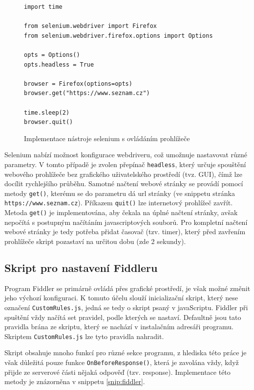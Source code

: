 \documentclass[thesis=M,czech,hidelinks]{FITthesis}[2013/05/06]
\begin{document}
\begin{figure}[h]               
\begin{verbatim}
import time

from selenium.webdriver import Firefox
from selenium.webdriver.firefox.options import Options

opts = Options()
opts.headless = True

browser = Firefox(options=opts)
browser.get("https://www.seznam.cz")

time.sleep(2)
browser.quit()
\end{verbatim}      
\caption{Implementace nástroje selenium s ovládáním prohlížeče}
\label{snip:selenium}
\end{figure}
Selenium nabízí možnost konfigurace webdriveru, což umožnuje nastavovat různé parametry. V tomto případě je zvolen přepínač \texttt{headless}, který určuje spouštění webového prohlížeče bez grafického uživatelského prostředí (tvz. GUI), čímž lze docílit rychlejšího průběhu. Samotné načtení webové stránky se provádí pomocí metody \texttt{get()}, kterému se do parametru dá url stránky (ve snippetu stránka \texttt{https://www.seznam.cz}). Příkazem \texttt{quit()} lze internetový prohlížeč zavřít. Metoda \texttt{get()} je implementována, aby čekala na úplné načtení stránky, avšak nepočítá s postupným načítáním javascriptových souborů. Pro kompletní načtení webové stránky je tedy potřeba přidat časovač (tzv. timer), který před zavřením prohlížeče skript pozastaví na určitou dobu (zde 2 sekundy).




\subsection{Skript pro nastavení Fiddleru}\label{sec:fiddler_setup}
Program Fiddler se primárně ovládá přes grafické prostředí, je však možné změnit jeho výchozí konfiguraci. K tomuto účelu slouží inicializační skript, který nese označení \texttt{CustomRules.js}, jedná se tedy o skript psaný v javaScriptu. Fiddler při spuštění vždy načítá set pravidel, podle kterých se nastaví. Defaultně jsou tato pravidla brána ze skriptu, který se nachází v instalačním adresáři programu. Skriptem \texttt{CustomRules.js} lze tyto pravidla nahradit.

Skript obsahuje mnoho funkcí pro různé sekce programu, z hlediska této práce je však důležitá pouze funkce \texttt{OnBeforeResponse()}, která je zavolána vždy, když přijde ze serverové části nějaká odpověď (tzv. response). Implementace této metody je znázorněna v snippetu \ref{snip:fiddler}.
\end{document}
